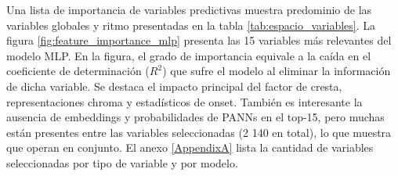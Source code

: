     

Una lista de importancia de variables predictivas muestra predominio de las variables globales y ritmo presentadas en la tabla \ref{tab:espacio_variables}. La figura \ref{fig:feature_importance_mlp} presenta las 15 variables más relevantes del modelo MLP. En la figura, el grado de importancia equivale a la caída en el coeficiente de determinación ($R^2$) que sufre el modelo al eliminar la información de dicha variable. Se destaca el impacto principal del factor de cresta, representaciones chroma y estadísticos de onset.
También es interesante la ausencia de embeddings y probabilidades de PANNs en el top-15, pero muchas están presentes entre las variables seleccionadas (2 140 en total), lo que muestra que operan en conjunto. El anexo \ref{AppendixA} lista la cantidad de variables seleccionadas por tipo de variable y por modelo.

